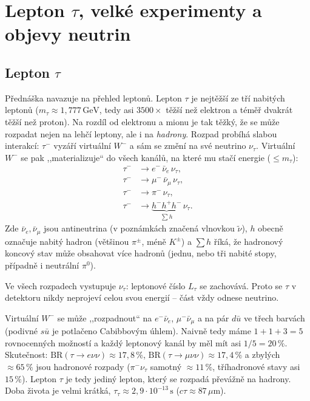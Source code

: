 \section{Lepton \texorpdfstring{$\tau$}{tau}, velké experimenty a objevy neutrin}

\subsection{Lepton \texorpdfstring{$\tau$}{tau}}

Přednáška navazuje na přehled leptonů. Lepton \(\tau\) je nejtěžší ze tří nabitých leptonů
(\(m_\tau \approx 1{,}777\,\mathrm{GeV}\), tedy asi \(3500\times\) těžší než elektron a téměř
dvakrát těžší než proton). Na rozdíl od elektronu a mionu je tak těžký, že se může rozpadat
nejen na lehčí leptony, ale i na \emph{hadrony}. Rozpad probíhá slabou interakcí: \(\tau^-\)
vyzáří virtuální \(W^-\) a sám se změní na své neutrino \(\nu_\tau\). Virtuální \(W^-\) se pak
,,materializuje`` do všech kanálů, na které mu stačí energie (\(\le m_\tau\)):
\begin{align*}
  \tau^- &\to e^- \,\bar\nu_e\, \nu_\tau, \\
  \tau^- &\to \mu^- \,\bar\nu_\mu\, \nu_\tau, \\
  \tau^- &\to \pi^- \,\nu_\tau, \\
  \tau^- &\to \underbrace{h^- h^+ h^-}_{\sum h}\, \nu_\tau .
\end{align*}
Zde \(\bar\nu_e,\bar\nu_\mu\) jsou antineutrina (v poznámkách značená vlnovkou \(\tilde\nu\)),
\(h\) obecně označuje nabitý hadron (většinou \(\pi^\pm\), méně \(K^\pm\)) a \(\sum h\) říká, že
hadronový koncový stav může obsahovat více hadronů (jednu, nebo tři nabité stopy, případně
i neutrální \(\pi^0\)).

Ve všech rozpadech vystupuje \(\nu_\tau\): leptonové číslo \(L_\tau\) se zachovává. Proto se
\(\tau\) v detektoru nikdy neprojeví celou svou energií -- část vždy odnese neutrino.

\begin{vysvetleni}
  Virtuální \(W^-\) se může ,,rozpadnout`` na \(e^-\bar\nu_e\), \(\mu^-\bar\nu_\mu\) a na pár
  \(d\bar u\) ve třech barvách (podivné \(s\bar u\) je potlačeno Cabibbovým úhlem). Naivně tedy
  máme \(1+1+3=5\) rovnocenných možností a každý leptonový kanál by měl mít asi \(1/5=20\,\%\).
  Skutečnost: \(\mathrm{BR}(\tau\to e\nu\nu)\approx 17{,}8\,\%\), \(\mathrm{BR}(\tau\to\mu\nu\nu)
  \approx 17{,}4\,\%\) a zbylých \(\approx 65\,\%\) jsou hadronové rozpady (\(\pi^-\nu_\tau\)
  samotný \(\approx 11\,\%\), tříhadronové stavy asi \(15\,\%\)). Lepton \(\tau\) je tedy
  jediný lepton, který se rozpadá převážně na hadrony. Doba života je velmi krátká,
  \(\tau_\tau\approx 2{,}9\cdot10^{-13}\,\mathrm{s}\) (\(c\tau\approx 87\,\mu\mathrm{m}\)).
\end{vysvetleni}

